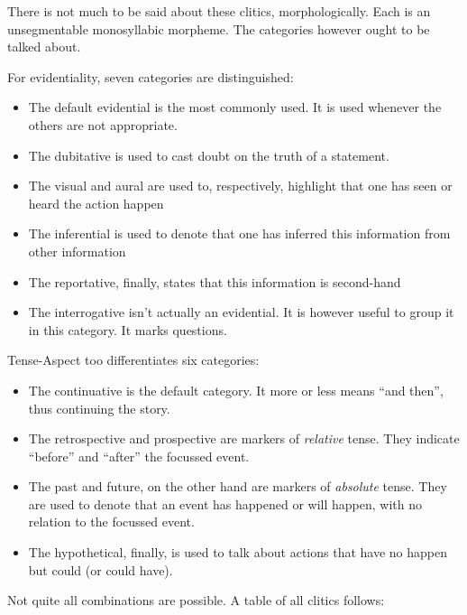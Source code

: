 \documentclass{article}
\begin{document}
There is not much to be said about these clitics, morphologically. Each is an unsegmentable monosyllabic morpheme. The categories however ought to be talked about. 

For evidentiality, seven categories are distinguished:

\begin{itemize}
\item The default evidential is the most commonly used. It is used whenever the others are not appropriate.
\item The dubitative is used to cast doubt on the truth of a statement.
\item The visual and aural are used to, respectively, highlight that one has seen or heard the action happen
\item The inferential is used to denote that one has inferred this information from other information
\item The reportative, finally, states that this information is second-hand
\item The interrogative isn’t actually an evidential. It is however useful to group it in this category. It marks questions.
\end{itemize}

Tense-Aspect too differentiates six categories:

\begin{itemize}
\item The continuative is the default category. It more or less means “and then”, thus continuing the story.
\item The retrospective and prospective are markers of \emph{relative} tense. They indicate “before” and “after” the focussed event.
\item The past and future, on the other hand are markers of \emph{absolute} tense. They are used to denote that an event has happened or will happen, with no relation to the focussed event.
\item The hypothetical, finally, is used to talk about actions that have no happen but could (or could have).
\end{itemize} 

Not quite all combinations are possible. A table of all clitics follows:
\end{document}
